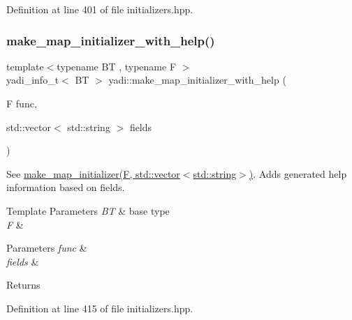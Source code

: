 Definition at line 401 of file initializers.\+hpp.

\mbox{\label{namespaceyadi_ad3b75d9038a0e5b77482456af2311b0d}} 
\subsubsection{\texorpdfstring{make\+\_\+map\+\_\+initializer\+\_\+with\+\_\+help()}{make\_map\_initializer\_with\_help()}\hspace{0.1cm}{\footnotesize\ttfamily [1/3]}}
{\footnotesize\ttfamily template$<$typename BT , typename F $>$ \\
yadi\+\_\+info\+\_\+t$<$ BT $>$ yadi\+::make\+\_\+map\+\_\+initializer\+\_\+with\+\_\+help (\begin{DoxyParamCaption}\item[{F}]{func,  }\item[{std\+::vector$<$ std\+::string $>$}]{fields }\end{DoxyParamCaption})}



See \hyperlink{namespaceyadi_a904dc2ee15dbdedd1b2dac4e0420fe15}{make\+\_\+map\+\_\+initializer(\+F, std\+::vector$<$std\+::string$>$)}. Adds generated help information based on fields. 


\begin{DoxyTemplParams}{Template Parameters}
{\em BT} & base type \\
\hline
{\em F} & \\
\hline
\end{DoxyTemplParams}

\begin{DoxyParams}{Parameters}
{\em func} & \\
\hline
{\em fields} & \\
\hline
\end{DoxyParams}
\begin{DoxyReturn}{Returns}

\end{DoxyReturn}


Definition at line 415 of file initializers.\+hpp.

\mbox{\label{namespaceyadi_acc00952238c78dc6fbfc89bfe6deb8ee}} 
